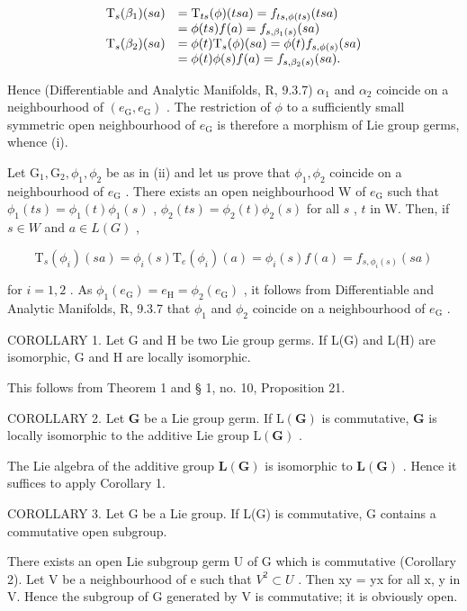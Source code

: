 \[
\begin{array}{r l} \mathrm{T} _ {s} (\beta_ {1}) (s a) & = \mathrm{T} _ {t s} (\phi) (t s a) = f _ {t s, \phi (t s)} (t s a) \\ & = \phi (t s) f (a) = f _ {s, \beta_ {1} (s)} (s a) \\ \mathrm{T} _ {s} (\beta_ {2}) (s a) & = \phi (t) \mathrm{T} _ {s} (\phi) (s a) = \phi (t) f _ {s, \phi (s)} (s a) \\ & = \phi (t) \phi (s) f (a) = f _ {s, \beta_ {2} (s)} (s a). \end{array}
\]

Hence (Differentiable and Analytic Manifolds, R, 9.3.7) \(\alpha_{1}\) and \(\alpha_{2}\) coincide on a neighbourhood of \((e_{\mathrm{G}}, e_{\mathrm{G}})\) . The restriction of \(\phi\) to a sufficiently small symmetric open neighbourhood of \(e_{\mathrm{G}}\) is therefore a morphism of Lie group germs, whence (i).

Let \(\mathrm{G}_1, \mathrm{G}_2, \phi_1, \phi_2\) be as in (ii) and let us prove that \(\phi_1, \phi_2\) coincide on a neighbourhood of \(e_{\mathrm{G}}\) . There exists an open neighbourhood W of \(e_{\mathrm{G}}\) such that \(\phi_1(t s) = \phi_1(t)\phi_1(s)\) , \(\phi_2(t s) = \phi_2(t)\phi_2(s)\) for all \(s\) , \(t\) in W. Then, if \(s \in W\) and \(a \in L(G)\) ,

\[
\mathrm{T} _ {s} \left(\phi_ {i}\right) (s a) = \phi_ {i} (s) \mathrm{T} _ {e} \left(\phi_ {i}\right) (a) = \phi_ {i} (s) f (a) = f _ {s, \phi _ {i} (s)} (s a)
\]

for \(i = 1,2\) . As \(\phi_1(e_{\mathrm{G}}) = e_{\mathrm{H}} = \phi_2(e_{\mathrm{G}})\) , it follows from Differentiable and Analytic Manifolds, R, 9.3.7 that \(\phi_1\) and \(\phi_2\) coincide on a neighbourhood of \(e_{\mathrm{G}}\) .

COROLLARY 1. Let G and H be two Lie group germs. If L(G) and L(H) are isomorphic, G and H are locally isomorphic.

This follows from Theorem 1 and § 1, no. 10, Proposition 21.

COROLLARY 2. Let \(\mathbf{G}\) be a Lie group germ. If \(\mathrm{L}(\mathbf{G})\) is commutative, \(\mathbf{G}\) is locally isomorphic to the additive Lie group \(\mathrm{L}(\mathbf{G})\) .

The Lie algebra of the additive group \(\mathbf{L}(\mathbf{G})\) is isomorphic to \(\mathbf{L}(\mathbf{G})\) . Hence it suffices to apply Corollary 1.

COROLLARY 3. Let G be a Lie group. If L(G) is commutative, G contains a commutative open subgroup.

There exists an open Lie subgroup germ U of G which is commutative (Corollary 2). Let V be a neighbourhood of e such that \(V^{2} \subset U\) . Then xy = yx for all x, y in V. Hence the subgroup of G generated by V is commutative; it is obviously open.


